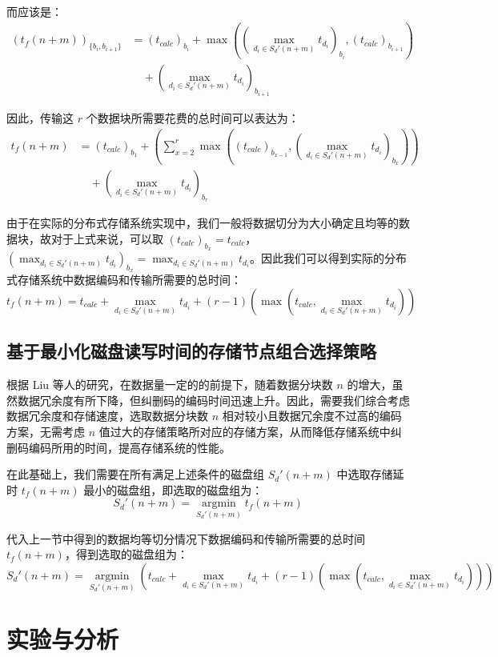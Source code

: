 而应该是：
\begin{align*}
\left(t_{f}(n+m)\right)_{\{b_{i},b_{i+1}\}}&=(t_{calc})_{b_{i}}+\max\left(\left(\max_{d_{i}{\in}S_{d}'(n+m)}t_{d_i}\right)_{b_{i}},(t_{calc})_{b_{i+1}}\right)\\
&\quad+\left(\max_{d_{i}{\in}S_{d}'(n+m)}t_{d_i}\right)_{b_{i+1}}
\end{align*}

因此，传输这 $r$ 个数据块所需要花费的总时间可以表达为：
\begin{align*}
t_{f}(n+m)&=(t_{calc})_{b_1}+\left(\sum_{x=2}^{r}\max\left((t_{calc})_{b_{x-1}},\left(\max_{d_{i}{\in}S_{d}'(n+m)}t_{d_i}\right)_{b_{x}}\right)\right)\\
&\quad+\left(\max_{d_{i}{\in}S_{d}'(n+m)}t_{d_i}\right)_{b_r}
\end{align*}

由于在实际的分布式存储系统实现中，我们一般将数据切分为大小确定且均等的数据块，故对于上式来说，可以取 $(t_{calc})_{b_x}=t_{calc}$，$\left(\displaystyle\max_{d_{i}{\in}S_{d}'(n+m)}t_{d_i}\right)_{b_{x}}=\displaystyle\max_{d_{i}{\in}S_{d}'(n+m)}t_{d_i}$。因此我们可以得到实际的分布式存储系统中数据编码和传输所需要的总时间：
$$
t_{f}(n+m)=t_{calc}+\max_{d_{i}{\in}S_{d}'(n+m)}t_{d_i}+(r-1)\left(\max\left(t_{calc},\max_{d_{i}{\in}S_{d}'(n+m)}t_{d_i}\right)\right)
$$
\subsection{基于最小化磁盘读写时间的存储节点组合选择策略}
根据 Liu 等人的研究\cite{liu2018implementation}，在数据量一定的的前提下，随着数据分块数 $n$ 的增大，虽然数据冗余度有所下降，但纠删码的编码时间迅速上升。因此，需要我们综合考虑数据冗余度和存储速度，选取数据分块数 $n$ 相对较小且数据冗余度不过高的编码方案，无需考虑 $n$ 值过大的存储策略所对应的存储方案，从而降低存储系统中纠删码编码所用的时间，提高存储系统的性能。

在此基础上，我们需要在所有满足上述条件的磁盘组 $S_{d}'(n+m)$ 中选取存储延时 $t_{f}(n+m)$ 最小的磁盘组，即选取的磁盘组为：
$$
S_{d}'(n+m)=\operatorname*{argmin}_{S_{d}'(n+m)}{t_{f}(n+m)}
$$

代入上一节中得到的数据均等切分情况下数据编码和传输所需要的总时间 $t_{f}(n+m)$，得到选取的磁盘组为：
$$
S_{d}'(n+m)=\operatorname*{argmin}_{S_{d}'(n+m)}\left(t_{calc}+\max_{d_{i}{\in}S_{d}'(n+m)}t_{d_i}+(r-1)\left(\max\left(t_{calc},\max_{d_{i}{\in}S_{d}'(n+m)}t_{d_i}\right)\right)\right)
$$
\section{实验与分析}
